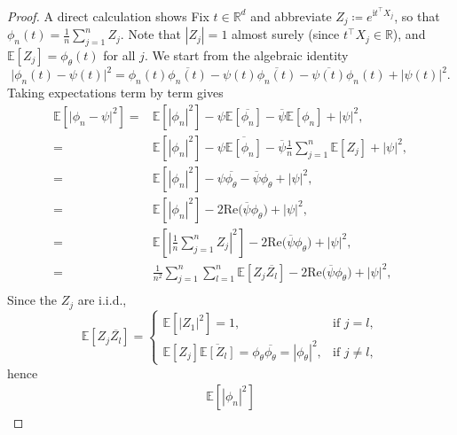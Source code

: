 \begin{proof}
A direct calculation shows
Fix $t \in \mathbb{R}^d$ and abbreviate $Z_j \coloneqq e^{\mathrm{i} t^\top X_j}$, so that $\phi_n(t) = \frac{1}{n}\sum_{j=1}^n Z_j$. Note that $|Z_j|=1$ almost surely (since $t^\top X_j\in\mathbb{R}$), and $\mathbb{E}[Z_j]=\phi_\theta(t)$ for all $j$.
We start from the algebraic identity
\[
\big|\phi_n(t) - \psi(t)\big|^2
=
\phi_n(t)\overline{\phi_n(t)}
-
\psi(t)\overline{\phi_n(t)}
-
\overline{\psi(t)}\phi_n(t)
+
\big|\psi(t)\big|^2.
\]
Taking expectations term by term gives
\begin{align}
\mathbb{E}\left[ \big|\phi_n - \psi\big|^2 \right]
=&
\mathbb{E}\left[ |\phi_n|^2 \right]
-
\psi\mathbb{E}\left[ \overline{\phi_n} \right]
-
\overline{\psi}\mathbb{E}\left[ \phi_n \right]
+
|\psi|^2,\\
=&
\mathbb{E}\left[ |\phi_n|^2 \right]
- \psi\overline{\mathbb{E}[\phi_n]}-\overline{\psi}\frac{1}{n}\sum_{j=1}^n \mathbb{E}[Z_j] +
|\psi|^2,\\
=&
\mathbb{E}\left[ |\phi_n|^2 \right]
-\psi\overline{\phi_\theta} - \overline{\psi}\phi_\theta+
|\psi|^2,\\
=&\mathbb{E}\left[ |\phi_n|^2 \right]
-2\mathrm{Re}\big( \overline{\psi}\phi_\theta \big)+
|\psi|^2,\\
=&\mathbb{E}\left[ \left|\frac{1}{n}\sum_{j=1}^n Z_j\right|^2 \right]-2\mathrm{Re}\big( \overline{\psi}\phi_\theta \big)+
|\psi|^2,\\
=&\frac{1}{n^2}\sum_{j=1}^n \sum_{l=1}^n \mathbb{E}\left[ Z_j\overline{Z_l} \right]-2\mathrm{Re}\big( \overline{\psi}\phi_\theta \big)+
|\psi|^2,\\
\end{align}
Since the $Z_j$ are i.i.d.,
\[
\mathbb{E}\left[ Z_j\overline{Z_l} \right]
=
\begin{cases}
\mathbb{E}\left[ |Z_1|^2 \right] = 1, & \text{if } j=l,\\[4pt]
\mathbb{E}[Z_j]\overline{\mathbb{E}[Z_l]} = \phi_\theta\overline{\phi_\theta} = |\phi_\theta|^2, & \text{if } j\neq l,
\end{cases}
\]
hence
\begin{align*}
    \mathbb{E}\left[ |\phi_n|^2 \right]

\end{align*}
\end{proof}
